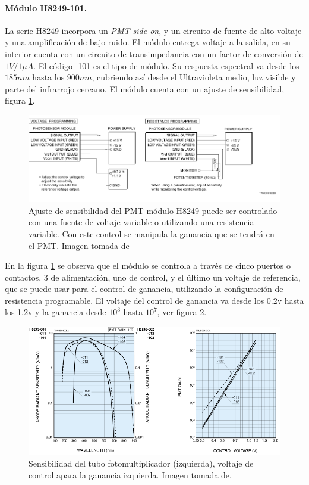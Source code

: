 \paragraph{Módulo H8249-101.}
La serie H8249 incorpora un \textit{PMT-side-on}, y un circuito de fuente de alto voltaje y una amplificación de bajo ruido. El módulo entrega voltaje a la salida, en su interior cuenta con un circuito de transimpedancia con un factor de conversión de $1V/1\mu A$. El código -101 es el tipo de módulo. Su respuesta espectral va desde los $185nm$ hasta los $900nm$, cubriendo así desde el Ultravioleta medio, luz visible y parte del infrarrojo cercano.
El módulo cuenta con un ajuste de sensibilidad, figura \ref{fig:sensibilidadajuste}.

\begin{figure}[h]
	\centering
	\includegraphics[width=0.8\linewidth]{Imagenes/2/SensibilidadAjuste}
	\caption[Ajuste de sensibilidad del PMT módulo H8249]{Ajuste de sensibilidad del PMT módulo H8249 puede ser controlado con una fuente de voltaje variable o utilizando una resistencia variable. Con este control se manipula la ganancia que se tendrá en el PMT. Imagen tomada de \cite{Hamamatsu2008}}
	\label{fig:sensibilidadajuste}
\end{figure}

 En la figura \ref{fig:sensibilidadajuste} se observa que el módulo se controla a través de cinco puertos o contactos, 3 de alimentación, uno de control, y el último un voltaje de referencia, que se puede usar para el control de ganancia, utilizando la configuración de resistencia programable. El voltaje del control de ganancia va desde los 0.2v hasta los 1.2v y la ganancia desde $10^{3}$ hasta $10^{7}$, ver figura \ref{fig:pmtgain}.
 \begin{figure}[h]
 	\centering
 	\includegraphics[width=0.7\linewidth]{Imagenes/2/PMT_GAIN}
 	\caption[Sensibilidad y ganancia H8249]{Sensibilidad del tubo fotomultiplicador (izquierda), voltaje de control apara la ganancia izquierda. Imagen tomada de. \cite{Hamamatsu2008}}
 	\label{fig:pmtgain}
 \end{figure}

